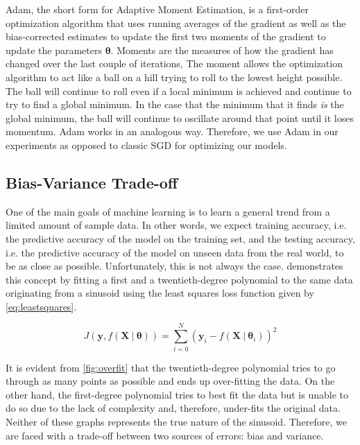 Adam, the short form for Adaptive Moment Estimation, is a first-order optimization algorithm that uses running averages of the gradient as well as the  bias-corrected estimates to update the first two moments of the gradient to update the parameters $\boldsymbol{\theta}$. Moments are the measures of how the gradient has changed over the last couple of iterations,  The moment allows the optimization algorithm to act like a ball on a hill trying to roll to the lowest height possible. The ball will continue to roll even if a local minimum is achieved and continue to try to find a global minimum. In the case that the minimum that it finds \textit{is} the global minimum, the ball will continue to oscillate around that point until it loses momentum. Adam works in an analogous way. Therefore, we use Adam in our experiments as opposed to classic SGD for optimizing our models. 

\subsection{Bias-Variance Trade-off}
\label{bias_variance_tradeoff}

One of the main goals of machine learning is to learn a general trend from a limited amount of sample data. In other words, we expect training accuracy, i.e. the predictive accuracy of the model on the training set, and the testing accuracy, i.e. the predictive accuracy of the model on unseen data from the real world, to be as close as possible. Unfortunately, this is not always the case.  demonstrates this concept by fitting a first and a twentieth-degree polynomial to the same data originating from a sinusoid using the least squares loss function given by \cref{eq:leastsquares}. 

\begin{equation}
	\label{eq:leastsquares}
	J(\mathbf{y}, f(\mathbf{X} \ | \ \boldsymbol{\theta})) = \sum_{i=0}^{N} (\mathbf{y}_i  - f(\mathbf{X} \ | \ \boldsymbol{\theta}_i))^2
\end{equation}


It is evident from \cref{fig:overfit} that the twentieth-degree polynomial tries to go through as many points as possible and ends up over-fitting the data. On the other hand, the first-degree polynomial tries to best fit the data but is unable to do so due to the lack of complexity and, therefore, under-fits the original data. Neither of these graphs represents the true nature of the sinusoid. Therefore, we are faced with a trade-off between two sources of errors: bias and variance. 

